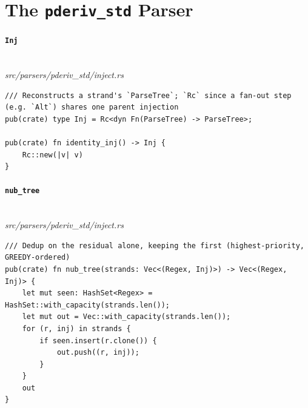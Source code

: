 \section{The \texttt{pderiv\_std} Parser}
\label{app:code-pderiv-std}

\paragraph{\texttt{Inj}}\ \\[-0.4em]
\textit{\small src/parsers/pderiv\_std/inject.rs}
{\scriptsize\begin{verbatim}
/// Reconstructs a strand's `ParseTree`; `Rc` since a fan-out step (e.g. `Alt`) shares one parent injection
pub(crate) type Inj = Rc<dyn Fn(ParseTree) -> ParseTree>;

pub(crate) fn identity_inj() -> Inj {
    Rc::new(|v| v)
}
\end{verbatim}}

\paragraph{\texttt{nub\_tree}}\ \\[-0.4em]
\textit{\small src/parsers/pderiv\_std/inject.rs}
{\scriptsize\begin{verbatim}
/// Dedup on the residual alone, keeping the first (highest-priority, GREEDY-ordered)
pub(crate) fn nub_tree(strands: Vec<(Regex, Inj)>) -> Vec<(Regex, Inj)> {
    let mut seen: HashSet<Regex> = HashSet::with_capacity(strands.len());
    let mut out = Vec::with_capacity(strands.len());
    for (r, inj) in strands {
        if seen.insert(r.clone()) {
            out.push((r, inj));
        }
    }
    out
}
\end{verbatim}}

